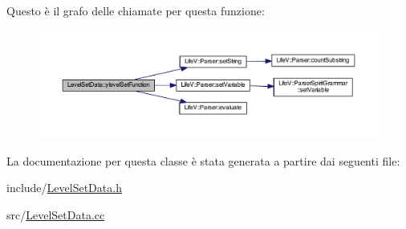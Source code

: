 Questo è il grafo delle chiamate per questa funzione\-:\nopagebreak
\begin{figure}[H]
\begin{center}
\leavevmode
\includegraphics[width=350pt]{classLevelSetData_a732ae59581206d4f94237e54bc0071e3_cgraph}
\end{center}
\end{figure}




La documentazione per questa classe è stata generata a partire dai seguenti file\-:\begin{DoxyCompactItemize}
\item 
include/\hyperlink{LevelSetData_8h}{Level\-Set\-Data.\-h}\item 
src/\hyperlink{LevelSetData_8cc}{Level\-Set\-Data.\-cc}\end{DoxyCompactItemize}
